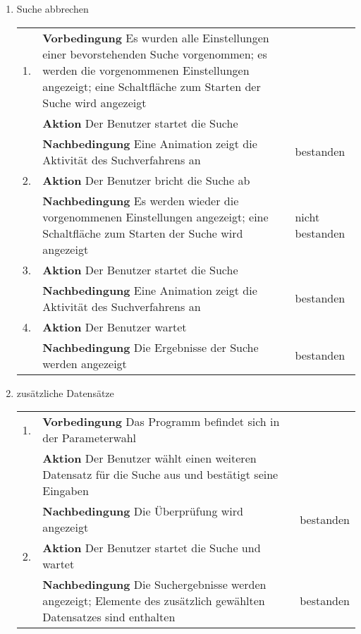 \begin{enumerate} [label=\bfseries /TSW \arabic*0/, leftmargin=*]
	\item Suche abbrechen \newline \newline
	\begin{tabular}{rp{4in}|l}
	1. & \textbf{Vorbedingung} Es wurden alle Einstellungen einer bevorstehenden Suche vorgenommen; es werden die vorgenommenen Einstellungen angezeigt; eine Schaltfläche zum Starten der Suche wird angezeigt & \\
	   & \textbf{Aktion} Der Benutzer startet die Suche & \\
	   & \textbf{Nachbedingung} Eine Animation zeigt die Aktivität des Suchverfahrens an & bestanden \\
	\hline
	2. & \textbf{Aktion} Der Benutzer bricht die Suche ab & \\
	   & \textbf{Nachbedingung} Es werden wieder die vorgenommenen Einstellungen angezeigt; eine Schaltfläche zum Starten der Suche wird angezeigt & nicht bestanden \\
	\hline
	3. & \textbf{Aktion} Der Benutzer startet die Suche & \\
	   & \textbf{Nachbedingung} Eine Animation zeigt die Aktivität des Suchverfahrens an & bestanden \\
	\hline
	4. & \textbf{Aktion} Der Benutzer wartet & \\
	   & \textbf{Nachbedingung} Die Ergebnisse der Suche werden angezeigt & bestanden \\
	\end{tabular}
	\newline

	\item zusätzliche Datensätze \newline \newline
	\begin{tabular}{rp{4in}|l}
	1. & \textbf{Vorbedingung} Das Programm befindet sich in der Parameterwahl & \\
	   & \textbf{Aktion} Der Benutzer wählt einen weiteren Datensatz für die Suche aus und bestätigt seine Eingaben & \\
	   & \textbf{Nachbedingung} Die Überprüfung wird angezeigt & bestanden \\
	\hline	
	2. & \textbf{Aktion} Der Benutzer startet die Suche und wartet & \\
	   & \textbf{Nachbedingung} Die Suchergebnisse werden angezeigt; Elemente des zusätzlich gewählten Datensatzes sind enthalten & bestanden \\
	\end{tabular}
	\newline


\end{enumerate}
